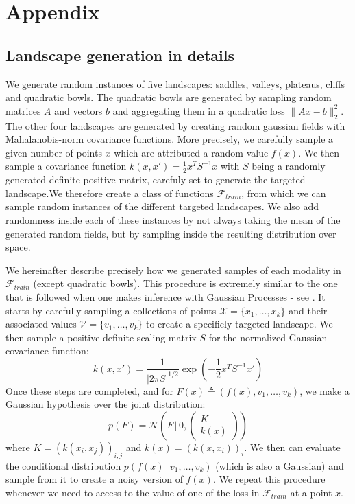 \chapter{Appendix}
{
	\section{Landscape generation in details}
	{
		\label{sec::landscape_detail}
		
		We generate random instances of five landscapes: saddles, valleys, plateaus, cliffs and quadratic bowls. The quadratic bowls are generated by sampling random matrices $A$ and vectors $b$ and aggregating them in a quadratic loss $\lVert Ax - b \rVert_2^2$. The other four landscapes are generated by creating random gaussian fields with Mahalanobis-norm covariance functions. More precisely, we carefully sample a given number of points $x$ which are attributed a random value $f(x)$. We then sample a covariance function $k(x,x') = \frac{1}{2} x^T S^{-1} x$ with $S$ being a randomly generated definite positive matrix, carefuly set to generate the targeted landscape.We therefore create a class of functions $\mathcal{F}_{train}$, from which we can sample random instances of the different targeted landscapes. We also add randomness inside each of these instances by not always taking the mean of the generated random fields, but by sampling inside the resulting distribution over space.
		
		We hereinafter describe precisely how we generated samples of each modality in $\mathcal{F}_{train}$ (except quadratic bowls). This procedure is extremely similar to the one that is followed when one makes inference with Gaussian Processes - see \cite{rasmussen2006gaussian}. It starts by carefully sampling a collections of points $\mathcal{X} = \{x_1,\hdots,x_k\}$ and their associated values $\mathcal{V} = \{v_1,\hdots,v_k\}$ to create a specificly targeted landscape. We then sample a positive definite scaling matrix $S$ for the normalized Gaussian covariance function: 
		\begin{equation}
			k(x,x') = \frac{1}{\vert 2\pi S\vert^{1/2}}\exp{\left(-\frac{1}{2}x^TS^{-1}x'\right)}
		\end{equation} 
		Once these steps are completed, and for $F(x) \triangleq \left(f(x),v_1,\hdots,v_k\right)$, we make a Gaussian hypothesis over the joint distribution:
		\begin{equation}
			 p(F) = \mathcal{N}\left( F\, \vert\, 0 , \begin{pmatrix} K \\ k(x) \end{pmatrix} \right)
		\end{equation} 
		where $K = (k(x_i,x_j))_{i,j}$ and $k(x) = (k(x,x_i))_i$. 
		We then can evaluate the conditional distribution $p(f(x) \, \vert \, v_1,\hdots,v_k)$ (which is also a Gaussian) and sample from it to create a noisy version of $f(x)$. We repeat this procedure whenever we need to access to the value of one of the loss in $\mathcal{F}_{train}$ at a point $x$. 
		
}}

